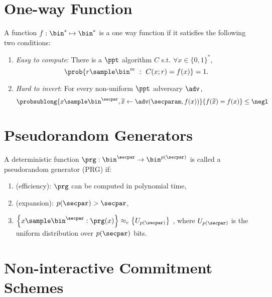 
\section{One-way Function}

\begin{definition}
		\label{def:strongOWF}
		A function $f:\bin^{*} \mapsto \bin^{*}$ is a one way function if it satisfies the following two conditions: 
		\begin{enumerate}
			\item \emph{ Easy to compute}: There is a $\ppt$ algorithm $C$ s.t. $\forall x \in \{0, 1\}^{*}$,
			\[
				\prob{r \sample \bin^{m}~:~C(x;r) = f(x)} =1.
			\]
			\item \emph{Hard to invert}: For every non-uniform $\ppt$ adversary $\adv$, 
			\[
				\probsublong{x \sample \bin^\secpar, \widetilde{x} \leftarrow \adv(\secparam, f(x))}{f(\widetilde{x})=f(x)} \le \negl
			\]		
		\end{enumerate}
	\end{definition}


\section{Pseudorandom Generators}


\begin{definition}
	A deterministic function $\prg: \bin^\secpar \rightarrow \bin^{p(\secpar)}$ is called a pseudorandom generator (PRG) if:
	\begin{enumerate}
		\item (efficiency): $\prg$ can be computed in polynomial time,
		\item (expansion): $p(\secpar) > \secpar$,
		\item $\llbrace x \sample \bin^\secpar: \prg(x) \rrbrace \approx_c \llbrace U_{p(\secpar)}\rrbrace$ , where $U_{p(\secpar)}$ is the uniform distribution over $p(\secpar)$ bits.
	\end{enumerate}
\end{definition}


\section{Non-interactive Commitment Schemes}
	
